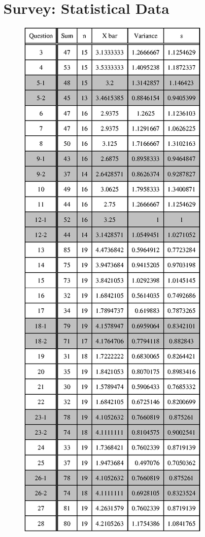 \chapter{Survey: Statistical Data}
\label{appndx:survey-statistical}

\begin{figure}[htbp]
  \centering
  \includegraphics{images/appndx-2.eps}
  \label{appndx-2}
\end{figure}

